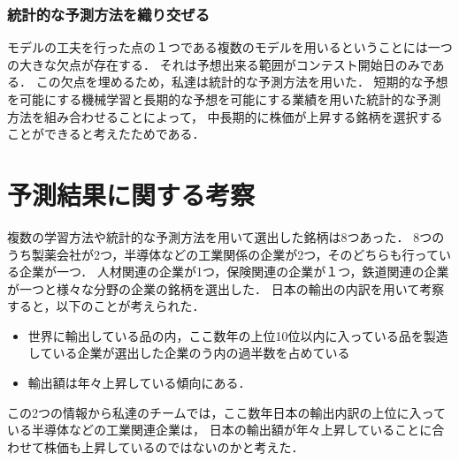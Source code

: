 \documentclass{jsarticle}
\begin{document}
\subsubsection{統計的な予測方法を織り交ぜる}
モデルの工夫を行った点の１つである複数のモデルを用いるということには一つの大きな欠点が存在する．
それは予想出来る範囲がコンテスト開始日のみである．
この欠点を埋めるため，私達は統計的な予測方法を用いた．
短期的な予想を可能にする機械学習と長期的な予想を可能にする業績を用いた統計的な予測方法を組み合わせることによって，
中長期的に株価が上昇する銘柄を選択することができると考えたためである．

\section{予測結果に関する考察}
複数の学習方法や統計的な予測方法を用いて選出した銘柄は8つあった．
8つのうち製薬会社が2つ，半導体などの工業関係の企業が2つ，そのどちらも行っている企業が一つ．
人材関連の企業が1つ，保険関連の企業が１つ，鉄道関連の企業が一つと様々な分野の企業の銘柄を選出した．
日本の輸出の内訳を用いて考察すると，以下のことが考えられた．

\begin{itemize}
\item 世界に輸出している品の内，ここ数年の上位10位以内に入っている品を製造している企業が選出した企業のう内の過半数を占めている
\item 輸出額は年々上昇している傾向にある．
\end{itemize}
この2つの情報から私達のチームでは，ここ数年日本の輸出内訳の上位に入っている半導体などの工業関連企業は，
日本の輸出額が年々上昇していることに合わせて株価も上昇しているのではないのかと考えた．
\end{document}
